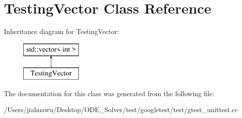 \hypertarget{class_testing_vector}{}\section{Testing\+Vector Class Reference}
\label{class_testing_vector}
Inheritance diagram for Testing\+Vector\+:\begin{figure}[H]
\begin{center}
\leavevmode
\includegraphics[height=2.000000cm]{class_testing_vector}
\end{center}
\end{figure}


The documentation for this class was generated from the following file\+:\begin{DoxyCompactItemize}
\item 
/\+Users/jiahuawu/\+Desktop/\+O\+D\+E\+\_\+\+Solver/test/googletest/test/gtest\+\_\+unittest.\+cc\end{DoxyCompactItemize}
